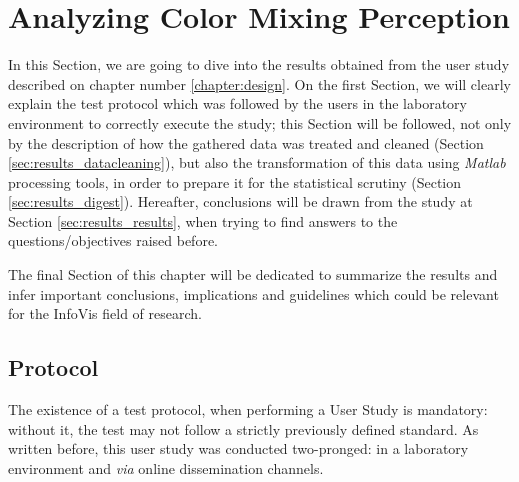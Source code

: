 
\chapter{Analyzing Color Mixing Perception}
\label{chapter:results}
%
In this Section, we are going to dive into the results obtained from the user study described on chapter number \ref{chapter:design}.
On the first Section, we will clearly explain the test protocol which was followed by the users in the laboratory environment to correctly
execute the study; this Section will be followed, not only by the description of how the gathered data was treated and cleaned
(Section \ref{sec:results_datacleaning}), but also the transformation of this data using \emph{Matlab} processing tools, in order to prepare
it for the statistical scrutiny (Section \ref{sec:results_digest}). Hereafter, conclusions will be drawn from the study at Section
\ref{sec:results_results}, when trying to find answers to the questions/objectives raised before. \par
%
The final Section of this chapter will be dedicated to summarize the results and infer important conclusions, implications and guidelines which
could be relevant for the InfoVis field of research.
\section{Protocol}
\label{sec:results_protocol}
%
The existence of a test protocol, when performing a User Study is mandatory: without it, the test may not follow a strictly previously defined
standard. As written before, this user study was conducted two-pronged: in a laboratory environment and \emph{via} online dissemination channels. \par
%
